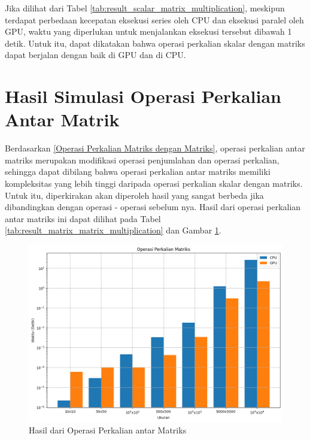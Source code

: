 Jika dilihat dari Tabel \ref{tab:result_scalar_matrix_multiplication}, meskipun terdapat perbedaan kecepatan eksekusi series oleh CPU dan eksekusi paralel oleh GPU, waktu yang diperlukan untuk menjalankan eksekusi tersebut dibawah 1 detik. Untuk itu, dapat dikatakan bahwa operasi perkalian skalar dengan matriks dapat berjalan dengan baik di GPU dan di CPU.

\section{Hasil Simulasi Operasi Perkalian Antar Matrik}

Berdasarkan \ref{Operasi Perkalian Matriks dengan Matriks}, operasi perkalian antar matriks merupakan modifikasi operasi penjumlahan dan operasi perkalian, sehingga dapat dibilang bahwa operasi perkalian antar matriks memiliki kompleksitas yang lebih tinggi daripada operasi perkalian skalar dengan matriks. Untuk itu, diperkirakan akan diperoleh hasil yang sangat berbeda jika dibandingkan dengan operasi - operasi sebelum nya. Hasil dari operasi perkalian antar matriks ini dapat dilihat pada Tabel \ref{tab:result_matrix_matrix_multiplication} dan Gambar \ref{img:result_matrix_matrix_multiplication}.

\begin{figure}[H]
	\centering
	\includegraphics[width=14cm, scale=1]{images/penelitian/matrix-matrix-multiplication.png}
	\caption{Hasil dari Operasi Perkalian antar Matriks}
	\label{img:result_matrix_matrix_multiplication}
\end{figure}

